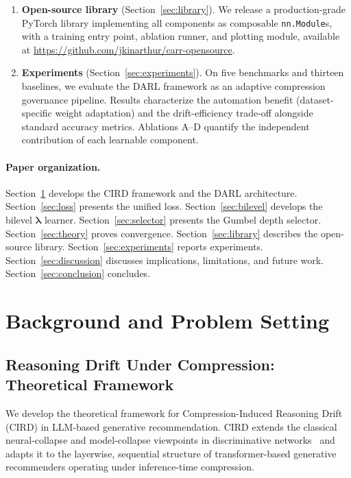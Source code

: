 \documentclass[lettersize,journal]{IEEEtran}
\newcommand{\lambdavec}{\boldsymbol{\lambda}}
\begin{document}
\begin{enumerate}
  \item \textbf{Open-source library} (Section~\ref{sec:library}).
    We release a production-grade PyTorch library
    implementing all components as composable \texttt{nn.Module}s,
    with a training entry point, ablation runner, and plotting module,
    available at \url{https://github.com/jkinarthur/carr-opensource}.

  \item \textbf{Experiments} (Section~\ref{sec:experiments}).
    On five benchmarks and thirteen baselines, we evaluate the DARL
    framework as an adaptive compression governance pipeline.
    Results characterize the automation benefit (dataset-specific
    weight adaptation) and the drift-efficiency trade-off alongside
    standard accuracy metrics.
    Ablations A--D quantify the independent contribution of each
    learnable component.
\end{enumerate}

\paragraph*{Paper organization.}
Section~\ref{sec:background} develops the CIRD framework and the
DARL architecture.
Section~\ref{sec:loss} presents the unified loss.
Section~\ref{sec:bilevel} develops the bilevel $\lambdavec$ learner.
Section~\ref{sec:selector} presents the Gumbel depth selector.
Section~\ref{sec:theory} proves convergence.
Section~\ref{sec:library} describes the open-source library.
Section~\ref{sec:experiments} reports experiments.
Section~\ref{sec:discussion} discusses implications, limitations, and future work.
Section~\ref{sec:conclusion} concludes.


\section{Background and Problem Setting}
\label{sec:background}

\subsection{Reasoning Drift Under Compression: Theoretical Framework}

We develop the theoretical framework for
Compression-Induced Reasoning Drift (CIRD) in LLM-based generative
recommendation.
CIRD extends the classical neural-collapse and model-collapse viewpoints
in discriminative networks~\cite{papyan2020neural,zhu2021geometric,han2022neural}
and adapts it to the layerwise, sequential structure of
transformer-based generative recommenders operating under
inference-time compression.
\end{document}
